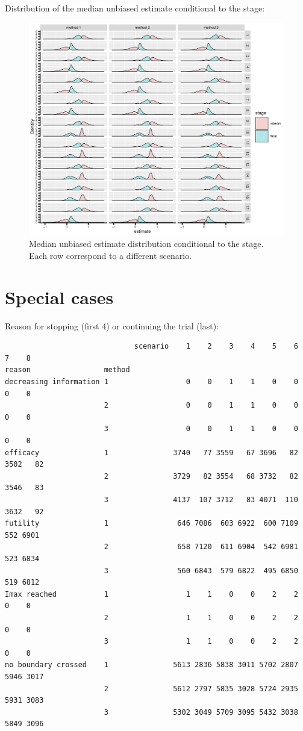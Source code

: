 \documentclass[12pt]{article}
\begin{document}
Distribution of the median unbiased estimate conditional to the stage:
\begin{figure}[!h]
\centering
\includegraphics[trim={0 0 0 0},width=1\textwidth]{./figures/gg-estimateC-density.pdf}
\caption{Median unbiased estimate distribution conditional to the stage. Each row correspond to a different scenario.}
\end{figure}

\clearpage

\section{Special cases}
\label{sec:org92e8523}

Reason for stopping (first 4) or continuing the trial (last):
\begin{verbatim}
                              scenario    1    2    3    4    5    6    7    8
reason                 method                                                 
decreasing information 1                  0    0    1    1    0    0    0    0
                       2                  0    0    1    1    0    0    0    0
                       3                  0    0    1    1    0    0    0    0
efficacy               1               3740   77 3559   67 3696   82 3502   82
                       2               3729   82 3554   68 3732   82 3546   83
                       3               4137  107 3712   83 4071  110 3632   92
futility               1                646 7086  603 6922  600 7109  552 6901
                       2                658 7120  611 6904  542 6981  523 6834
                       3                560 6843  579 6822  495 6850  519 6812
Imax reached           1                  1    1    0    0    2    2    0    0
                       2                  1    1    0    0    2    2    0    0
                       3                  1    1    0    0    2    2    0    0
no boundary crossed    1               5613 2836 5838 3011 5702 2807 5946 3017
                       2               5612 2797 5835 3028 5724 2935 5931 3083
                       3               5302 3049 5709 3095 5432 3038 5849 3096
\end{verbatim}
\end{document}
